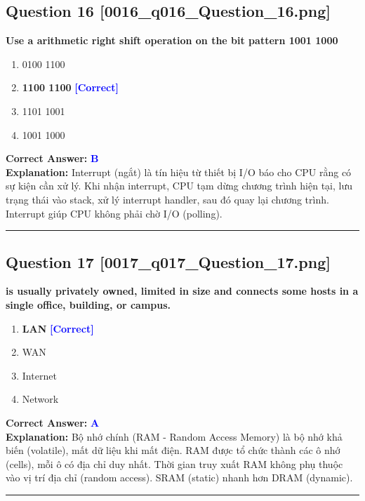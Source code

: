 \documentclass[11pt,a4paper]{article}
\begin{document}
\begin{minipage}{\textwidth}
\subsection*{Question 16 \quad \footnotesize{[0016\_q016\_Question\_16.png]}}
\noindent \textbf{Use a arithmetic right shift operation on the bit pattern 1001 1000}

\begin{enumerate}[label=\Alph*.]
    \item 0100 1100
    \item \textbf{1100 1100} \hfill \textcolor{blue}{\textbf{[Correct]}}
    \item 1101 1001
    \item 1001 1000
\end{enumerate}

\noindent \textbf{Correct Answer:} \textcolor{blue}{\textbf{B}} \\[2pt]
\noindent \textbf{Explanation:} Interrupt (ngắt) là tín hiệu từ thiết bị I/O báo cho CPU rằng có sự kiện cần xử lý. Khi nhận interrupt, CPU tạm dừng chương trình hiện tại, lưu trạng thái vào stack, xử lý interrupt handler, sau đó quay lại chương trình. Interrupt giúp CPU không phải chờ I/O (polling).

\par\vspace{0.3cm}
\hrule
\vspace{0.3cm}
\end{minipage}

\begin{minipage}{\textwidth}
\subsection*{Question 17 \quad \footnotesize{[0017\_q017\_Question\_17.png]}}
\noindent \textbf{is usually privately owned, limited in size and connects some hosts in a single office, building, or campus.}

\begin{enumerate}[label=\Alph*.]
    \item \textbf{LAN} \hfill \textcolor{blue}{\textbf{[Correct]}}
    \item WAN
    \item Internet
    \item Network
\end{enumerate}

\noindent \textbf{Correct Answer:} \textcolor{blue}{\textbf{A}} \\[2pt]
\noindent \textbf{Explanation:} Bộ nhớ chính (RAM - Random Access Memory) là bộ nhớ khả biến (volatile), mất dữ liệu khi mất điện. RAM được tổ chức thành các ô nhớ (cells), mỗi ô có địa chỉ duy nhất. Thời gian truy xuất RAM không phụ thuộc vào vị trí địa chỉ (random access). SRAM (static) nhanh hơn DRAM (dynamic).

\par\vspace{0.3cm}
\hrule
\vspace{0.3cm}
\end{minipage}
\end{document}
